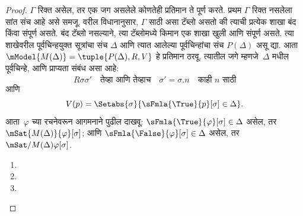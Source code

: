 \begin{proof}
$\Gamma$ रिक्त असेल, तर एक जग असलेले कोणतेही प्रतिमान
ते पूर्ण करते. प्रथम $\Gamma$ रिक्त नसलेला सांत संच आहे
असे समजू. वरील विधानानुसार, $\Gamma$ साठी असा
टॅब्लो असतो की त्याची प्रत्येक शाखा
बंद किंवा संपूर्ण असते. बंद टॅब्लो नसल्याने,
त्या टॅब्लोमध्ये किमान एक शाखा
खुली आणि संपूर्ण असते. त्या शाखेवरील
पूर्वचिन्हयुक्त सूत्रांचा संच
$\Delta$ आणि त्यात आलेल्या पूर्वचिन्हांचा
संच $P(\Delta)$ असू द्या.
आता $\mModel{M(\Delta)} = \tuple{P(\Delta), R, V}$
हे प्रतिमान ठरवू. त्यातील जगे म्हणजे~$\Delta$
मधील पूर्वचिन्हे, आणि प्राप्यता संबंध असा आहे:
\[
R\sigma\sigma' \quad \text{तेव्हा आणि तेव्हाच} \quad
\sigma'=\sigma.n \quad \text{काही~$n$ साठी}
\]
आणि
\[V(p) = \Setabs{\sigma}{\sFmla{\True}{p}[\sigma] \in \Delta}.
\]
आता~$\varphi$ च्या रचनेवरून आगमनाने पुढील
दाखवू: $\sFmla{\True}{\varphi}[\sigma] \in
\Delta$ असेल, तर
$\mSat{M(\Delta)}{\varphi}[\sigma]$; आणि
$\sFmla{\False}{\varphi}[\sigma] \in \Delta$
असेल, तर $\mSat/{M(\Delta)}{\varphi}[\sigma]$.

\begin{enumerate}
  \item {}
  \item {}
  \item {}
\end{enumerate}
\end{proof}
